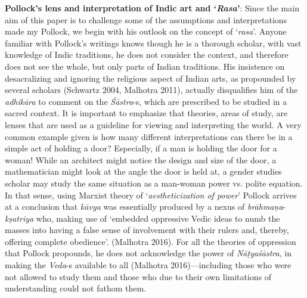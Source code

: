 \textbf{Pollock’s lens and interpretation of Indic art and ‘\textsl{Rasa}'}: Since the main aim of this paper is to challenge some of the assumptions and interpretations made my Pollock, we begin with his outlook on the concept of ‘\textsl{rasa}'. Anyone familiar with Pollock’s writings knows though he is a thorough scholar, with vast knowledge of Indic traditions, he does not consider the context, and therefore does not see the whole, but only parts of Indian traditions. His insistence on desacralizing and ignoring the religious aspect of Indian arts, as propounded by several scholars (Schwartz 2004, Malhotra 2011), actually disqualifies him of the \textsl{adhikāra} to comment on the \textsl{Śāstra}-s, which are prescribed to be studied in a sacred context. It is important to emphasize that theories, areas of study, are lenses that are used as a guideline for viewing and interpreting the world. A very common example given is how many different interpretations can there be in a simple act of holding a door? Especially, if a man is holding the door for a woman! While an architect might notice the design and size of the door, a mathematician might look at the angle the door is held at, a gender studies scholar may study the same situation as a man-woman power vs. polite equation. In that sense, using Marxist theory of ‘\textsl{aestheticization of power}’ Pollock arrives at a conclusion that \textsl{kāvya} was essentially produced by a nexus of \textsl{brāhmaṇa}-\textsl{kṣatriya} who, making use of ‘embedded oppressive Vedic ideas to numb the masses into having a false sense of involvement with their rulers and, thereby, offering complete obedience’. (Malhotra 2016). For all the theories of oppression that Pollock propounds, he does not acknowledge the power of \textsl{Nāṭyaśāstra}, in making the \textsl{Veda}-s available to all (Malhotra 2016)---including those who were not allowed to study them and those who due to their own limitations of understanding could not fathom them. 

\newpage

